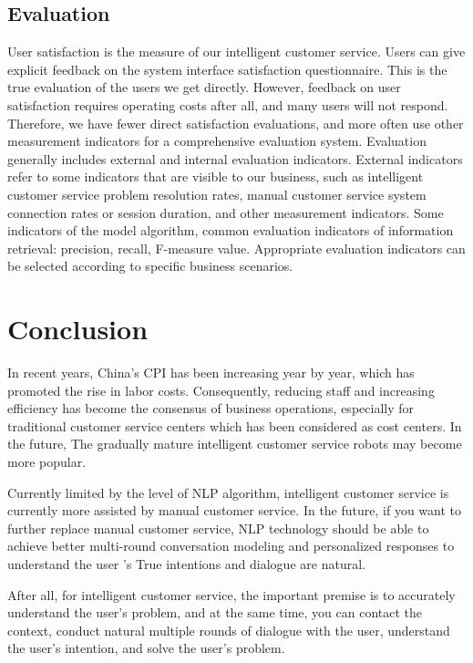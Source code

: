 \documentclass[11pt,en,number]{elegantpaper}
\begin{document}
		\subsection{Evaluation}
		User satisfaction is the measure of our intelligent customer service. Users can give explicit feedback on the system interface satisfaction questionnaire. This is the true evaluation of the users we get directly. However, feedback on user satisfaction requires operating costs after all, and many users will not respond. Therefore, we have fewer direct satisfaction evaluations, and more often use other measurement indicators for a comprehensive evaluation system.
		Evaluation generally includes external and internal evaluation indicators. External indicators refer to some indicators that are visible to our business, such as intelligent customer service problem resolution rates, manual customer service system connection rates or session duration, and other measurement indicators. Some indicators of the model algorithm, common evaluation indicators of information retrieval: precision, recall, F-measure value. Appropriate evaluation indicators can be selected according to specific business scenarios.
	\section{Conclusion}
	In recent years, China's CPI has been increasing year by year, which has promoted the rise in labor costs. Consequently, reducing staff and increasing efficiency has become the consensus of business operations, especially for traditional customer service centers which has been considered as cost centers. In the future, The gradually mature intelligent customer service robots may become more popular.

	Currently limited by the level of NLP algorithm, intelligent customer service is currently more assisted by manual customer service\cite{14}. In the future, if you want to further replace manual customer service, NLP technology should be able to achieve better multi-round conversation modeling and personalized responses to understand the user ’s True intentions and dialogue are natural.

	After all, for intelligent customer service, the important premise is to accurately understand the user's problem, and at the same time, you can contact the context, conduct natural multiple rounds of dialogue with the user, understand the user's intention, and solve the user's problem.

	\nocite{*}

\end{document}
